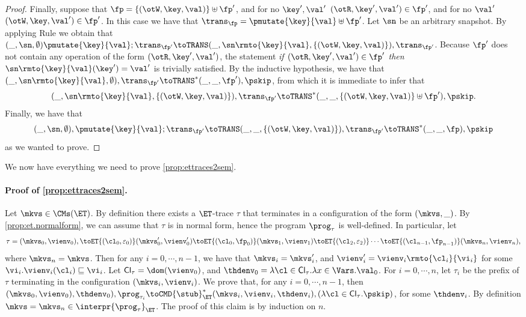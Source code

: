 \begin{proof}
Finally, suppose that $\fp = \{(\otW, \key, \val)\} \uplus \fp'$, and 
for no  $\key', \val'$ $(\otR,\key', \val') \in \fp'$, and for no $\val'$ 
$(\otW, \key, \val') \in \fp'$. In this case we have that $\trans_{\fp} = 
\pmutate{\key}{\val} \uplus \fp'$. Let $\sn$ be an arbitrary snapshot. 
By applying Rule  we obtain that $(\_, \sn, \emptyset) \pmutate{\key}{\val} ; \trans_{\fp'} 
\toTRANS (\_, \sn\rmto{\key}{\val}, \{(\otW, \key, \val)\}), \trans_{\fp'}$. Because $\fp'$ does not contain 
any operation of the form $(\otR, \key', \val')$, the statement \emph{if $(\otR,\key',\val') \in \fp'$ then 
$\sn\rmto{\key}{\val}(\key') = \val'$} is trivially satisfied. By the inductive hypothesis, we have that 
$(\_, \sn\rmto{\key}{\val}, \emptyset), \trans_{\fp'} \toTRANS^{\ast} (\_, \_, \fp'), \pskip$, 
from which it is immediate to infer that 
\[
(\_, \sn\rmto{\key}{\val}, \{(\otW, \key, \val)\}), \trans_{\fp'} \toTRANS^{\ast} (\_, \_, \{(\otW, \key, \val)\} \uplus \fp'), \pskip. 
\]
Finally, we have that 
\[
(\_, \sn, \emptyset), \pmutate{\key}{\val} ; \trans_{\fp'} \toTRANS (\_, \_, \{(\otW, \key, \val)\}), \trans_{\fp'} \toTRANS^{\ast} (\_, \_, \fp), \pskip
\]
as we wanted to prove.
\end{proof}

We now have everything we need to prove \cref{prop:ettraces2sem}.
\paragraph{Proof of \cref{prop:ettraces2sem}.}
Let $\mkvs \in \CMs(\ET)$. By definition there exists a $\ET$-trace $\tau$ that 
terminates in a configuration of the form $(\mkvs, \_)$. By \cref{prop:et.normalform}, we 
can assume that $\tau$ is in normal form, hence the program $\prog_{\tau}$ is well-defined. 
In particular, let 
\[
\tau = (\mkvs_{0}, \vienv_{0}), \toET{(\cl_{0}, \varepsilon_{0})} (\mkvs_{0}', \vienv_{0}') \toET{(\cl_{0}, \fp_{0})} (\mkvs_{1}, \vienv_{1}) 
\toET{(\cl_{2}, \varepsilon_{2})} \cdots \toET{(\cl_{n-1}, \fp_{n-1})} (\mkvs_{n}, \vienv_{n}),
\]
where $\mkvs_{n} = \mkvs$. Then for any $i =0,\cdots, n-1$, we have that $\mkvs_{i} = \mkvs'_{i}$, 
and $\vienv'_{i} = \vienv_{i}\rmto{\cl_{i}}{\vi_{i}}$ for some $\vi_{i}. \vienv_{i}(\cl_{i}) \sqsubseteq \vi_{i}$.
Let $\mathsf{Cl}_{\tau} = \dom(\vienv_{0})$, and $\thdenv_{0} = \lambda \cl \in \mathsf{Cl}_{\tau}. \lambda x \in \Vars. \val_{0}$. 
For $i=0,\cdots, n$, let $\tau_{i}$ be the prefix of $\tau$ terminating in the configuration $(\mkvs_{i}, \vienv_{i})$.
We prove that, for any $i=0,\cdots, n-1$, 
then $(\mkvs_{0}, \vienv_{0}), \thdenv_{0}), \prog_{\tau_{i}} \toCMD{\stub}^{\ast}_{\ET} (\mkvs_{i}, \vienv_{i}, \thdenv_{i}), (\lambda \cl \in \mathsf{Cl}_{\tau}.\pskip)$, 
for some $\thdenv_{i}$. By definition $\mkvs = \mkvs_{n} \in \interpr{\prog_{\tau}}_{\ET}$. 
The proof of this claim is by induction on $n$.

